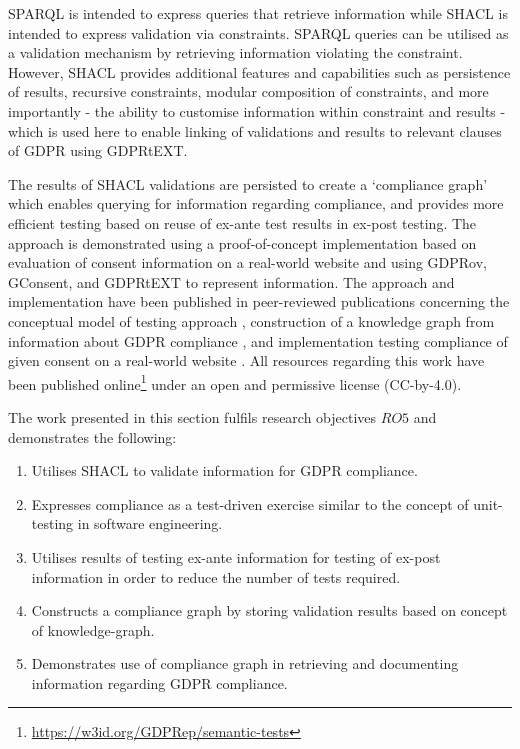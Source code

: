 SPARQL is intended to express queries that retrieve information while SHACL is intended to express validation via constraints. SPARQL queries can be utilised as a validation mechanism by retrieving information violating the constraint. 
However, SHACL provides additional features and capabilities such as persistence of results, recursive constraints, modular composition of constraints, and more importantly - the ability to customise information within constraint and results - which is used here to enable linking of validations and results to relevant clauses of GDPR using GDPRtEXT.

The results of SHACL validations are persisted to create a `compliance graph' which enables querying for information regarding compliance, and provides more efficient testing based on reuse of ex-ante test results in ex-post testing.
The approach is demonstrated using a proof-of-concept implementation based on evaluation of consent information on a real-world website and using GDPRov, GConsent, and GDPRtEXT to represent information.
The approach and implementation have been published in peer-reviewed publications concerning the conceptual model of testing approach \cite{pandit_exploring_2018}, construction of a knowledge graph from information about GDPR compliance \cite{pandit_towards_2018}, and implementation testing compliance of given consent on a real-world website \cite{pandit_test-driven_2019}.
All resources regarding this work have been published online\footnote{\url{https://w3id.org/GDPRep/semantic-tests}} under an open and permissive license (CC-by-4.0).

The work presented in this section fulfils research objectives $RO5$ and demonstrates the following:
\begin{enumerate}
    \item Utilises SHACL to validate information for GDPR compliance.
    \item Expresses compliance as a test-driven exercise similar to the concept of unit-testing in software engineering.
    \item Utilises results of testing ex-ante information for testing of ex-post information in order to reduce the number of tests required.
    \item Constructs a compliance graph by storing validation results based on concept of knowledge-graph.
    \item Demonstrates use of compliance graph in retrieving and documenting information regarding GDPR compliance.
\end{enumerate}

